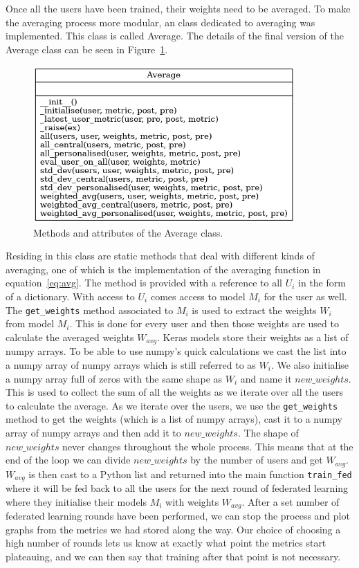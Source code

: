 \documentclass[12pt]{article}
\begin{document}
\\\\
Once all the users have been trained, their weights need to be averaged. To make the averaging process more modular, an class dedicated to averaging was implemented. This class is called Average. The details of the final version of the Average class can be seen in Figure~\ref{fig:classes_average}.
\begin{figure}[H]
	\centering
	\includegraphics[width=10cm]{resources/classes_Average.png}
	\caption{Methods and attributes of the Average class.}
	\label{fig:classes_average}
\end{figure}
\noindent Residing in this class are static methods that deal with different kinds of averaging, one of which is the implementation of the averaging function in equation~\ref{eq:avg}. The method is provided with a reference to all $U_i$ in the form of a dictionary. With access to $U_i$ comes access to model $M_i$ for the user as well. The \texttt{get\_weights} method associated to $M_i$ is used to extract the weights $W_i$ from model $M_i$. This is done for every user and then those weights are used to calculate the averaged weights $W_{avg}$. Keras models store their weights as a list of numpy arrays. To be able to use numpy's quick calculations we cast the list into a numpy array of numpy arrays which is still referred to as $W_i$. We also initialise a numpy array full of zeros with the same shape as $W_i$ and name it $new\_weights$. This is used to collect the sum of all the weights as we iterate over all the users to calculate the average. As we iterate over the users, we use the \texttt{get\_weights} method to get the weights (which is a list of numpy arrays), cast it to a numpy array of numpy arrays and then add it to $new\_weights$. The shape of $new\_weights$ never changes throughout the whole process. This means that at the end of the loop we can divide $new\_weights$ by the number of users and get $W_{avg}$. $W_{avg}$ is then cast to a Python list and returned into the main function \texttt{train\_fed} where it will be fed back to all the users for the next round of federated learning where they initialise their models $M_i$ with weights $W_{avg}$. After a set number of federated learning rounds have been performed, we can stop the process and plot graphs from the metrics we had stored along the way. Our choice of choosing a high number of rounds lets us know at exactly what point the metrics start plateauing, and we can then say that training after that point is not necessary. 
\end{document}
